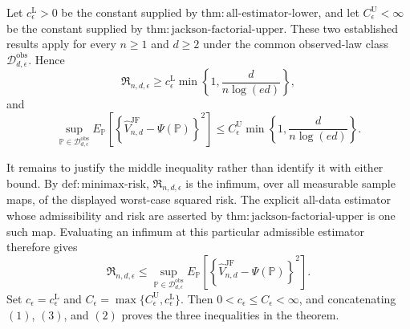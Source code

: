 Let \(c_{\epsilon}^{\mathrm L}>0\) be the constant supplied by \(\mathrm{thm:all\mbox{-}estimator\mbox{-}lower}\), and let \(C_{\epsilon}^{\mathrm U}<\infty\) be the constant supplied by \(\mathrm{thm:jackson\mbox{-}factorial\mbox{-}upper}\).  These two established results apply for every \(n\geq1\) and \(d\geq2\) under the common observed-law class \(\mathcal D_{d,\epsilon}^{\mathrm{obs}}\).  Hence
\[
 \mathfrak R_{n,d,\epsilon}
 \geq c_{\epsilon}^{\mathrm L}
 \min\!\left\{1,\frac{d}{n\log(ed)}\right\},                                      \tag{1}
\]
and
\[
 \sup_{\mathbb P\in\mathcal D_{d,\epsilon}^{\mathrm{obs}}}
 E_{\mathbb P}\!\left[
 \left\{\widehat V_{n,d}^{\mathrm{JF}}-\Psi(\mathbb P)\right\}^{2}
 \right]
 \leq C_{\epsilon}^{\mathrm U}
 \min\!\left\{1,\frac{d}{n\log(ed)}\right\}.                                      \tag{2}
\]

It remains to justify the middle inequality rather than identify it with either bound.  By \(\mathrm{def:minimax\mbox{-}risk}\), \(\mathfrak R_{n,d,\epsilon}\) is the infimum, over all measurable sample maps, of the displayed worst-case squared risk.  The explicit all-data estimator whose admissibility and risk are asserted by \(\mathrm{thm:jackson\mbox{-}factorial\mbox{-}upper}\) is one such map.  Evaluating an infimum at this particular admissible estimator therefore gives
\[
 \mathfrak R_{n,d,\epsilon}
 \leq
 \sup_{\mathbb P\in\mathcal D_{d,\epsilon}^{\mathrm{obs}}}
 E_{\mathbb P}\!\left[
 \left\{\widehat V_{n,d}^{\mathrm{JF}}-\Psi(\mathbb P)\right\}^{2}
 \right].                                                                            \tag{3}
\]
Set \(c_\epsilon=c_{\epsilon}^{\mathrm L}\) and \(C_\epsilon=\max\{C_{\epsilon}^{\mathrm U},c_{\epsilon}^{\mathrm L}\}\).  Then \(0<c_\epsilon\leq C_\epsilon<\infty\), and concatenating \((1)\), \((3)\), and \((2)\) proves the three inequalities in the theorem.

